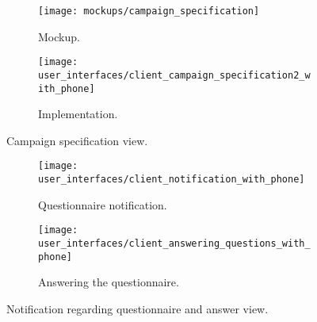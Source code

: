 \begin{figure}
\begin{subfigure}[!t]{.48\textwidth}
  \centering
  \texttt{[image: mockups/campaign\_specification]}
  \caption{Mockup.}
  \label{fig:mockup_campaign_specification}
\end{subfigure}%
\begin{subfigure}[!t]{.52\textwidth}
  \centering
  \texttt{[image: user\_interfaces/client\_campaign\_specification2\_with\_phone]}
  \caption{Implementation.}
  \label{fig:implementation_campaign_specification}
\end{subfigure}
\caption{Campaign specification view.}
\label{fig:campaign_specification}
\end{figure}
\FloatBarrier

\begin{figure}
\begin{subfigure}[!t]{.50\textwidth}
  \centering
  \texttt{[image: user\_interfaces/client\_notification\_with\_phone]}
  \caption{Questionnaire notification.}
  \label{fig:answering_questionnaire_notification}
\end{subfigure}%
\begin{subfigure}[!t]{.50\textwidth}
  \centering
  \texttt{[image: user\_interfaces/client\_answering\_questions\_with\_phone]}
  \caption{Answering the questionnaire.}
  \label{fig:answering_questionnaire_answering}
\end{subfigure}
\caption{Notification regarding questionnaire and answer view.}
\label{fig:answering_questionnaire}
\end{figure}
\FloatBarrier